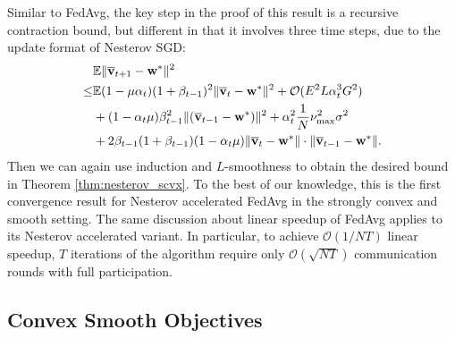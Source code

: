 Similar to FedAvg, the key step in the proof of this result is a recursive contraction bound, but different in that it involves three time steps, due to the update format of Nesterov SGD:
\begin{align*}
&\mathbb{E}\|{\overline{\mathbf{v}}}_{t+1}-{\mathbf{w}}^{\ast}\|^{2} \\
\leq & \mathbb{E}(1-\mu\alpha_{t})(1+\beta_{t-1})^{2}\|{\overline{\mathbf{v}}}_{t}-{\mathbf{w}}^{\ast}\|^{2}+\mathcal{O}(E^{2}L\alpha_{t}^{3}G^{2})\\
&+(1-\alpha_{t}\mu)\beta_{t-1}^{2}\|({\overline{\mathbf{v}}}_{t-1}-{\mathbf{w}}^{\ast})\|^{2} +\alpha_{t}^{2}\frac{1}{N}\nu_{\max}^{2}\sigma^{2}\\
&+2\beta_{t-1}(1+\beta_{t-1})(1-\alpha_{t}\mu)\|{\overline{\mathbf{v}}}_{t}-{\mathbf{w}}^{\ast}\|\cdot\|{\overline{\mathbf{v}}}_{t-1}-{\mathbf{w}}^{\ast}\|.
\end{align*} 
Then we can again use induction and $L$-smoothness to obtain the desired bound in Theorem \ref{thm:nesterov_scvx}.
%
To the best of our knowledge, this is the first convergence result for Nesterov
accelerated FedAvg in the strongly convex and smooth setting. The
same discussion about linear speedup of FedAvg applies to its Nesterov
accelerated variant. In particular, to achieve $\mathcal{O}(1/NT)$
linear speedup, $T$ iterations of the algorithm require only $\mathcal{O}(\sqrt{NT})$
communication rounds with full participation. 


\subsection{Convex Smooth Objectives}

